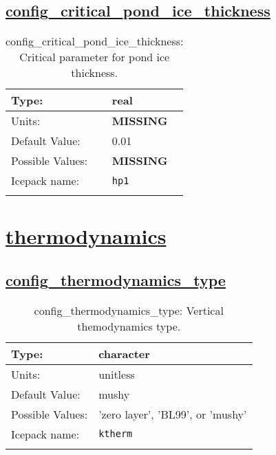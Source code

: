 \subsection[config\_critical\_pond\_ice\_thickness]{\hyperref[sec:nm_tab_meltponds]{config\_critical\_pond\_ice\_thickness}}
\label{subsec:nm_sec_config_critical_pond_ice_thickness}
\begin{center}
\begin{longtable}{| p{2.0in} || p{4.0in} |}
    \hline
    Type: & real \\
    \hline
    Units: & {\bf \color{red} MISSING} \\
    \hline
    Default Value: & 0.01 \\
    \hline
    Possible Values: & {\bf \color{red} MISSING} \\
    \hline
    Icepack name: & \verb+hp1+ \\
    \hline
    \caption{config\_critical\_pond\_ice\_thickness: Critical parameter for pond ice thickness.}
\end{longtable}
\end{center}
\section[thermodynamics]{\hyperref[sec:nm_tab_thermodynamics]{thermodynamics}}
\label{sec:nm_sec_thermodynamics}
\subsection[config\_thermodynamics\_type]{\hyperref[sec:nm_tab_thermodynamics]{config\_thermodynamics\_type}}
\label{subsec:nm_sec_config_thermodynamics_type}
\begin{center}
\begin{longtable}{| p{2.0in} || p{4.0in} |}
    \hline
    Type: & character \\
    \hline
    Units: & \si{unitless} \\
    \hline
    Default Value: & mushy \\
    \hline
    Possible Values: & 'zero layer', 'BL99', or 'mushy' \\
    \hline
    Icepack name: & \verb+ktherm+ \\
    \hline
    \caption{config\_thermodynamics\_type: Vertical themodynamics type.}
\end{longtable}
\end{center}
